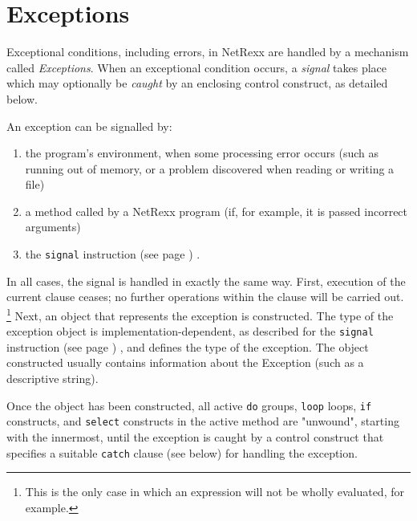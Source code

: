 \chapter{Exceptions}\label{"id"}
 
Exceptional conditions, including errors, in NetRexx are handled by a
mechanism called \emph{Exceptions}.
When an exceptional condition occurs, a \emph{signal} takes place
which may optionally be \emph{caught} by an enclosing control
construct, as detailed below.
 
An exception can be signalled by:
\begin{enumerate}
\item the program's environment, when some processing error occurs (such
as running out of memory, or a problem discovered when reading or
writing a file)
\item a method called by a NetRexx program (if, for example, it is passed
incorrect arguments)
\item the  \texttt{signal} instruction (see page \pageref{refsignal}) .
\end{enumerate}
In all cases, the signal is handled in exactly the same way.
First, execution of the current clause ceases; no further operations
within the clause will be carried out.
\footnote{
This is the only case in which an expression will not be wholly
evaluated, for example.
}
Next, an object that represents the exception is constructed.  The type
of the exception object is implementation-dependent, as described for
the  \texttt{signal} instruction (see page \pageref{refsignal}) , and defines the
type of the exception.  The object constructed usually contains
information about the Exception (such as a descriptive string).
 
Once the object has been constructed, all active \texttt{do} groups,
\texttt{loop} loops, \texttt{if} constructs, and \texttt{select}
constructs in the active method are "unwound", starting with the
innermost, until the exception is caught by a control construct that
specifies a suitable \texttt{catch} clause (see below) for handling the
exception.
 
